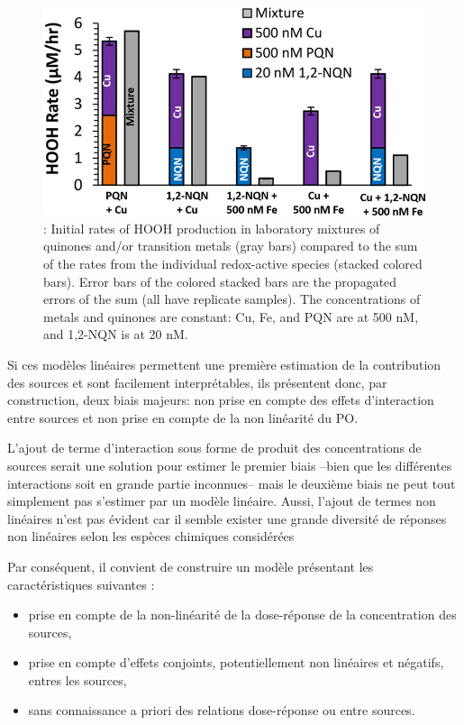 \begin{figure}[ht]
    \centering
    \includegraphics[width=0.5\linewidth]{figures/chapter05/charrier_hydrogen_2014_fig4.jpg}
    \caption{\cite[figure 4]{charrierHydrogen2014}: Initial rates of HOOH production in
    laboratory mixtures of quinones and/or transition metals (gray bars) compared to the
    sum of the rates from the individual redox-active species (stacked colored bars). Error
    bars of the colored stacked bars are the propagated errors of the sum (all have replicate
    samples). The concentrations of metals and quinones are constant: Cu, Fe, and PQN are at
    500 nM, and 1,2-NQN is at 20 nM.}%
    \label{fig:charrier_hydrogen_2014_fig4}
\end{figure}

Si ces modèles linéaires permettent une première estimation de la contribution des sources et sont
facilement interprétables, ils présentent donc, par construction, deux biais majeurs: non
prise en compte des effets d'interaction entre sources et non prise en compte de la non
linéarité du PO.

L'ajout de terme d'interaction sous forme de produit des concentrations de sources serait
une solution pour estimer le premier biais --bien que les différentes interactions soit en grande partie inconnues--
mais le deuxième biais ne peut tout simplement
pas s'estimer par un modèle linéaire. Aussi, l'ajout de termes non linéaires n'est pas
évident car il semble exister une grande diversité de réponses non linéaires selon les
espèces chimiques
considérées~\autocite{charrierDithiothreitol2012,charrierBias2016,calasImportance2017}

Par conséquent, il convient de construire un modèle présentant les caractéristiques
suivantes :
\begin{itemize}
    \item prise en compte de la non-linéarité de la dose-réponse de la concentration des
        sources,
    \item prise en compte d'effets conjoints, potentiellement non linéaires et négatifs,
        entres les sources,
    \item sans connaissance a priori des relations dose-réponse ou entre sources.
\end{itemize}

